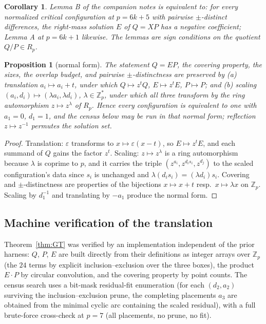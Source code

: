 \documentclass[11pt,a4paper]{article}
\numberwithin{equation}{section}
\theoremstyle{plain}
\theoremstyle{plain}
\newtheorem{corollary}[theorem]{Corollary}
\newtheorem{proposition}[theorem]{Proposition}
\theoremstyle{definition}
\theoremstyle{remark}
\newcommand{\Z}{\mathbb{Z}}
\begin{document}
\begin{corollary}\label{cor:signform}
Lemma B of the companion notes is equivalent to: for every normalized
critical configuration at $p=6k+5$ with pairwise $\pm$-distinct differences,
the right-mass solution $E$ of $Q=XP$ has a negative coefficient; Lemma A at
$p=6k+1$ likewise. The lemmas are sign conditions on the quotient
$Q/P\in R_p$.
\end{corollary}

\begin{proposition}[normal form]\label{prop:normalform}
The statement $Q=EP$, the covering property, the sizes, the overlap budget,
and pairwise $\pm$-distinctness are preserved by \textup{(a)} translation
$a_i\mapsto a_i+t$, under which $Q\mapsto z^{t}Q$, $E\mapsto z^{t}E$,
$P\mapsto P$; and \textup{(b)} scaling $(a_i,d_i)\mapsto(\lambda a_i,
\lambda d_i)$, $\lambda\in\Z_p^{*}$, under which all three transform by the
ring automorphism $z\mapsto z^{\lambda}$ of $R_p$. Hence every configuration
is equivalent to one with $a_1=0$, $d_1=1$, and the census below may be run
in that normal form; reflection $z\mapsto z^{-1}$ permutes the solution set.
\end{proposition}

\begin{proof}
Translation: $\varepsilon$ transforms to $x\mapsto\varepsilon(x-t)$, so
$E\mapsto z^tE$, and each summand of $Q$ gains the factor $z^t$. Scaling:
$z\mapsto z^\lambda$ is a ring automorphism because $\lambda$ is coprime to
$p$, and it carries the triple $(z^{a_i},z^{d_is_i},z^{d_j})$ to the scaled
configuration's data since $s_i$ is unchanged and
$\lambda(d_is_i)=(\lambda d_i)s_i$. Covering and $\pm$-distinctness are
properties of the bijections $x\mapsto x+t$ resp.\ $x\mapsto\lambda x$ on
$\Z_p$. Scaling by $d_1^{-1}$ and translating by $-a_1$ produce the normal
form.
\end{proof}

\subsection{Machine verification of the translation}\label{sec:gt-verify}

Theorem~\ref{thm:GT} was verified by an implementation independent of the
prior harness: $Q$, $P$, $E$ are built directly from their definitions as
integer arrays over $\Z_p$ (the $24$ terms by explicit inclusion--exclusion
over the three boxes), the product $E\cdot P$ by circular convolution, and
the covering property by point counts. The census search uses a
bit-mask residual-fit enumeration (for each $(d_2,a_2)$ surviving the
inclusion--exclusion prune, the completing placements $a_3$ are obtained
from the minimal cyclic arc containing the scaled residual), with a full
brute-force cross-check at $p=7$ (all placements, no prune, no fit).
\end{document}

